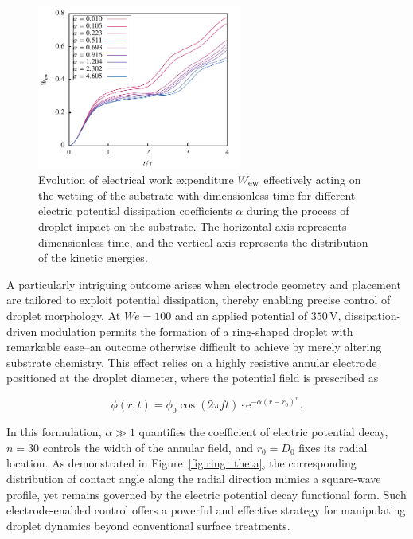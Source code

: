 \documentclass[lineno]{cls/jfm}
\begin{document}
 \begin{figure}
  \centerline{\includegraphics[width=0.6\textwidth]{fig/dropEW.pdf}}
  \caption{Evolution of electrical work expenditure $W_{\rm ew}$ effectively acting on the wetting of the substrate with dimensionless time for different electric potential dissipation coefficients $\alpha$ during the process of droplet impact on the substrate. The horizontal axis represents dimensionless time, and the vertical axis represents the distribution of the kinetic energies.}
 \label{fig:EW}
 \end{figure}

 A particularly intriguing outcome arises when electrode geometry and placement are tailored to exploit potential dissipation, thereby enabling precise control of droplet morphology. At $We=100$ and an applied potential of $350\,\mathrm{V}$, dissipation-driven modulation permits the formation of a ring-shaped droplet with remarkable ease--an outcome otherwise difficult to achieve by merely altering substrate chemistry. This effect relies on a highly resistive annular electrode positioned at the droplet diameter, where the potential field is prescribed as

\begin{equation}
  \phi(r,t) = \phi_0 \cos(2\pi f t) \cdot \mathrm{e}^{- \alpha (r-r_0)^n}.
  \label{eq:ring dissipation}
\end{equation}

 \noindent In this formulation, $\alpha \gg 1$ quantifies the coefficient of electric potential decay, $n=30$ controls the width of the annular field, and $r_0 = D_0$ fixes its radial location. As demonstrated in Figure~\ref{fig:ring_theta}, the corresponding distribution of contact angle along the radial direction mimics a square-wave profile, yet remains governed by the electric potential decay functional form. Such electrode-enabled control offers a powerful and effective strategy for manipulating droplet dynamics beyond conventional surface treatments.
\end{document}
